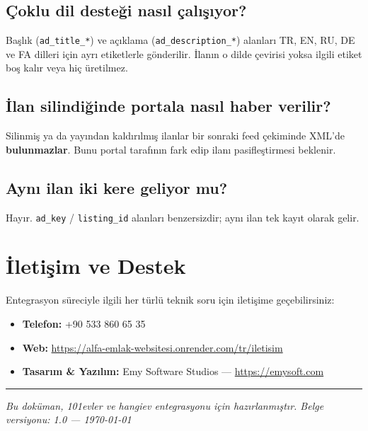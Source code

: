 \documentclass[11pt,a4paper]{article}
\begin{document}
\subsection*{Çoklu dil desteği nasıl çalışıyor?}
Başlık (\texttt{ad\_title\_*}) ve açıklama (\texttt{ad\_description\_*}) alanları TR, EN, RU, DE ve FA dilleri için ayrı etiketlerle gönderilir. İlanın o dilde çevirisi yoksa ilgili etiket boş kalır veya hiç üretilmez.

\subsection*{İlan silindiğinde portala nasıl haber verilir?}
Silinmiş ya da yayından kaldırılmış ilanlar bir sonraki feed çekiminde XML'de \textbf{bulunmazlar}. Bunu portal tarafının fark edip ilanı pasifleştirmesi beklenir.

\subsection*{Aynı ilan iki kere geliyor mu?}
Hayır. \texttt{ad\_key} / \texttt{listing\_id} alanları benzersizdir; aynı ilan tek kayıt olarak gelir.

\section{İletişim ve Destek}

Entegrasyon süreciyle ilgili her türlü teknik soru için iletişime geçebilirsiniz:

\begin{itemize}[leftmargin=*]
\item \textbf{Telefon:} +90 533 860 65 35
\item \textbf{Web:} \url{https://alfa-emlak-websitesi.onrender.com/tr/iletisim}
\item \textbf{Tasarım \& Yazılım:} Emy Software Studios — \url{https://emysoft.com}
\end{itemize}

\vspace{0.4cm}
\hrule
\vspace{0.4cm}
\begin{center}
\small\itshape\color{black!60}
Bu doküman, 101evler ve hangiev entegrasyonu için hazırlanmıştır. Belge versiyonu: 1.0 — \today
\end{center}
\end{document}

